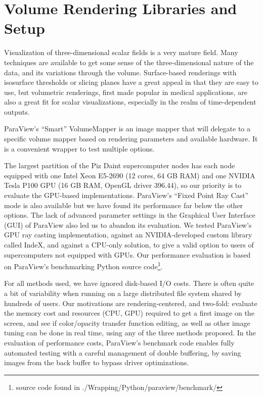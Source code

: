 \documentclass[5p,times]{elsarticle}
\begin{document}
\section{Volume Rendering Libraries and Setup}

Visualization of three-dimensional scalar fields is a very mature field. Many techniques are
available to get some sense of the three-dimensional nature of the data, and its variations
through the volume. Surface-based renderings with isosurface thresholds or
slicing planes have a great appeal in that they are easy to use, but volumetric
renderings, first made popular in medical applications, are also a great fit for
scalar visualizations, especially in the realm of time-dependent outputs.

ParaView's ``Smart'' VolumeMapper is an image mapper
that will delegate to a specific volume mapper based on rendering parameters and
available hardware. It is a convenient wrapper to test multiple options.

The largest partition of the Piz Daint supercomputer nodes has each node equipped
with one Intel Xeon E5-2690 (12 cores, 64 GB RAM) and one NVIDIA
Tesla P100 GPU (16 GB RAM, OpenGL driver 396.44), so our priority is to evaluate
the GPU-based implementations.
ParaView's ``Fixed Point Ray Cast'' mode is also available but we have found its performance far
below the other options. The lack of advanced parameter settings in the Graphical
User Interface (GUI) of ParaView also led us to abandon its evaluation. We tested ParaView's GPU
ray casting implementation, against an NVIDIA-developed custom library called
IndeX, and against a CPU-only solution, to give a valid option to users of
supercomputers not equipped with GPUs.
Our performance evaluation is based on ParaView's benchmarking Python source
code\footnote{source code found in ./Wrapping/Python/paraview/benchmark/}.

For all methods used, we have ignored disk-based I/O costs. There is often quite
a bit of variability when running on a large distributed file system shared by
hundreds of users. Our motivations are rendering-centered, and two-fold:
evaluate the memory cost and resources (CPU, GPU) required to get a first image
on the screen, and see if color/opacity transfer
function editing, as well as other image tuning can be done in real time, using
any of the three methods proposed. In the evaluation of performance costs, ParaView's
benchmark code enables fully automated testing with a careful management of
double buffering, by saving images from the back buffer to bypass driver optimizations.
\end{document}
